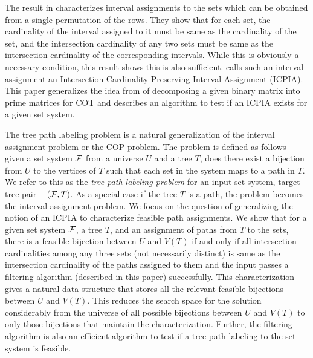 \documentclass[MS]             %
              {iitmdiss_as}    %
\begin{document}
The result in
\cite{nsnrs09} characterizes interval assignments to the sets which
can be obtained from a single permutation of the rows.  They show that
for each set, the cardinality of the interval assigned to it must be
same as the cardinality of the set, and the intersection cardinality
of any two sets must be same as the intersection cardinality of the
corresponding intervals.  While this is obviously a necessary
condition, this result shows this is also sufficient.  \cite{nsnrs09}
calls such an interval assignment an Intersection Cardinality
Preserving Interval Assignment (ICPIA).  This paper generalizes the
idea from \cite{wlh02} of decomposing a given binary matrix into prime
matrices for COT and describes an algorithm to test if an ICPIA exists
for a given set system.


The tree path labeling problem is a natural generalization of the
interval assignment problem or the COP problem. The problem is defined
as follows -- given a set system ${\cal F}$ from a universe $U$ and a tree
$T$, does there exist a bijection from $U$ to the vertices of $T$ such
that each set in the system maps to a path in $T$.  We refer to this
as the {\em tree path labeling problem} for an input set system,
target tree pair -- $({\cal F},T)$. As a special case if the tree $T$ is a
path, the problem becomes the interval assignment problem.  We focus
on the question of generalizing the notion of an ICPIA \cite{nsnrs09}
to characterize feasible path assignments.  We show that for a given
set system ${\cal F}$, a tree $T$, and an assignment of paths from $T$ to
the sets, there is a feasible bijection between $U$ and $V(T)$ if and
only if all intersection cardinalities among any three sets (not
necessarily distinct) is same as the intersection cardinality of the
paths assigned to them and the input passes a filtering algorithm
(described in this paper) successfully.  This characterization gives a
natural data structure that stores all the relevant feasible
bijections between $U$ and $V(T)$. This reduces the search space for
the solution considerably from the universe of all possible bijections
between $U$ and $V(T)$ to only those bijections that maintain the
characterization.  Further, the filtering algorithm
is also an efficient algorithm to test if a tree path labeling to the
set system is
feasible.  %


\end{document}
